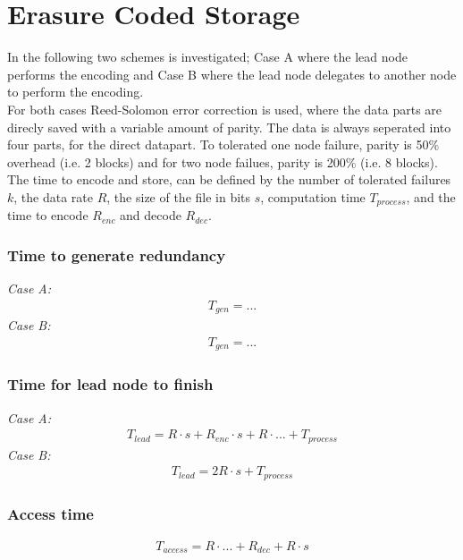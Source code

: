 \section{Erasure Coded Storage} \label{sec:ec}
In the following two schemes is investigated; Case A where the lead node performs the encoding and Case B where the lead node delegates to another node to perform the encoding.\\
For both cases Reed-Solomon error correction is used, where the data parts are direcly saved with a variable amount of parity. The data is always seperated into four parts, for the direct datapart. To tolerated one node failure, parity is 50\% overhead (i.e. 2 blocks) and for two node failues, parity is 200\% (i.e. 8 blocks).\\
The time to encode and store, can be defined by the number of tolerated failures $k$, the data rate $R$, the size of the file in bits $s$, computation time $T_{process}$, and the time to encode $R_{enc}$ and decode $R_{dec}$.

\subsubsection*{Time to generate redundancy}
\textit{Case A:} 
\begin{align}
    T_{gen} = ...
\end{align}
\textit{Case B:} 
\begin{align}
    T_{gen} = ...
\end{align}

\subsubsection*{Time for lead node to finish}
\textit{Case A:} 
\begin{align}
    T_{lead} = R \cdot s + R_{enc} \cdot s + R \cdot ... + T_{process}
\end{align}
\textit{Case B:} 
\begin{align}
    T_{lead} = 2R \cdot s + T_{process}
\end{align}

\subsubsection*{Access time}
\begin{align}
    T_{access} = R \cdot ... + R_{dec} + R \cdot s
\end{align}

